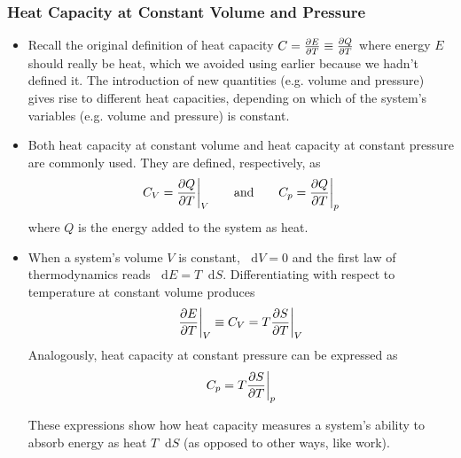 \documentclass[11pt, a4paper]{article}
\newcommand{\diff}{\mathop{}\!\mathrm{d}} %
\begin{document}
\subsubsection{Heat Capacity at Constant Volume and Pressure}
\begin{itemize}
	\item Recall the original definition of heat capacity $ C = \pdv{E}{T} \equiv \pdv{Q}{T} $ where energy $ E $ should really be heat, which we avoided using earlier because we hadn't defined it. The introduction of new quantities (e.g. volume and pressure) gives rise to different heat capacities, depending on which of the system's variables (e.g. volume and pressure) is constant. 
	
	\item Both heat capacity at constant volume and heat capacity at constant pressure are commonly used. They are defined, respectively, as
	\begin{equation*}
		C_{V} = \pdv{Q}{T} \bigg |_{V} \qquad \text{and} \qquad C_{p} = \pdv{Q}{T} \bigg |_{p}
	\end{equation*}
	where $ Q $ is the energy added to the system as heat.
	
	\item When a system's volume $ V $ is constant, $ \diff V = 0 $ and the first law of thermodynamics reads $ \diff E = T \diff S $. Differentiating with respect to temperature at constant volume produces
	\begin{equation*}
		\pdv{E}{T}\bigg |_{V} \equiv C_{V} = T \pdv{S}{T}\bigg |_{V}
	\end{equation*}
	Analogously, heat capacity at constant pressure can be expressed as
	\begin{equation*}
		C_{p} = T \pdv{S}{T}\bigg |_{p}
	\end{equation*}
	
	These expressions show how heat capacity measures a system's ability to absorb energy as heat $ T \diff S $ (as opposed to other ways, like work).
	
\end{itemize}
\end{document}
